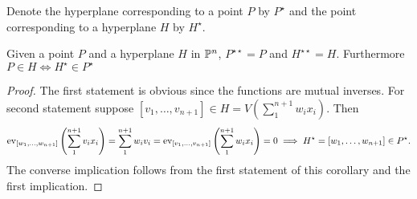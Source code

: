     \begin{remark}
        Denote the hyperplane corresponding to a point $P$ by $P^\star$ and the point corresponding to a hyperplane $H$ by $H^\star$.
    \end{remark}
    \begin{corollary}\label{CorrespondenceOfPointsAndHyperplanes}
        Given a point $P$ and a hyperplane $H$ in $\mathbb{P}^n$, $P^{\star\star}=P$ and $H^{\star\star}=H$. Furthermore $P\in H\iff H^\star \in P^\star$ 
    \end{corollary}
    \begin{proof}
        The first statement is obvious since the functions are mutual inverses. For second statement suppose $[v_1,\dots,v_{n+1}]\in H=V\left(\sum_1^{n+1} w_ix_i\right)$. Then 
        $$\mathrm{ev}_{[w_1,\dots,w_{n+1}]}\left(\sum_1^{n+1} v_ix_i\right)=\sum_1^{n+1} w_iv_i=\mathrm{ev}_{[v_1,\dots,v_{n+1}]}\left(\sum_1^{n+1} w_ix_i\right) =0 \implies H^\star = [w_1,\dots,w_{n+1}]\in P^\star.$$
        The converse implication follows from the first statement of this corollary and the first implication. 
    \end{proof}
